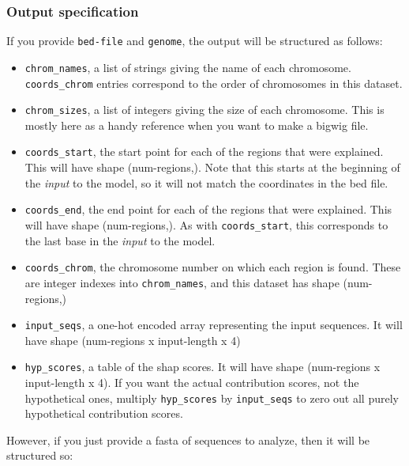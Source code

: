 \documentclass{article}
\begin{document}
\subsubsection{Output specification}

If you provide \texttt{bed-file} and \texttt{genome}, the output will be
structured as follows:

\begin{itemize}
    \item \texttt{chrom\_names}, a list of strings giving the name of each
        chromosome.
        \texttt{coords\_chrom} entries correspond to the order of chromosomes
        in this dataset.
    \item \texttt{chrom\_sizes}, a list of integers giving the size of each
        chromosome.
        This is mostly here as a handy reference when you want to make a bigwig
        file.
    \item \texttt{coords\_start}, the start point for each of the regions that
        were explained.
        This will have shape (num-regions,).
        Note that this starts at the beginning of the \emph{input} to the model,
        so it will not match the coordinates in the bed file.
    \item \texttt{coords\_end}, the end point for each of the regions that were
        explained.
        This will have shape (num-regions,).
        As with \texttt{coords\_start}, this corresponds to the last base in the
        \emph{input} to the model.
    \item \texttt{coords\_chrom}, the chromosome number on which each region is
        found.
        These are integer indexes into \texttt{chrom\_names}, and this dataset
        has shape (num-regions,)
    \item \texttt{input\_seqs}, a one-hot encoded array representing the input
        sequences.
        It will have shape (num-regions x input-length x 4)
    \item \texttt{hyp\_scores}, a table of the shap scores.
        It will have shape (num-regions x input-length x 4).
        If you want the actual contribution scores, not the hypothetical ones,
        multiply \texttt{hyp\_scores} by \texttt{input\_seqs} to zero out
        all purely hypothetical contribution scores.

\end{itemize}

However, if you just provide a fasta of sequences to analyze, then it will be
structured so:
\end{document}
